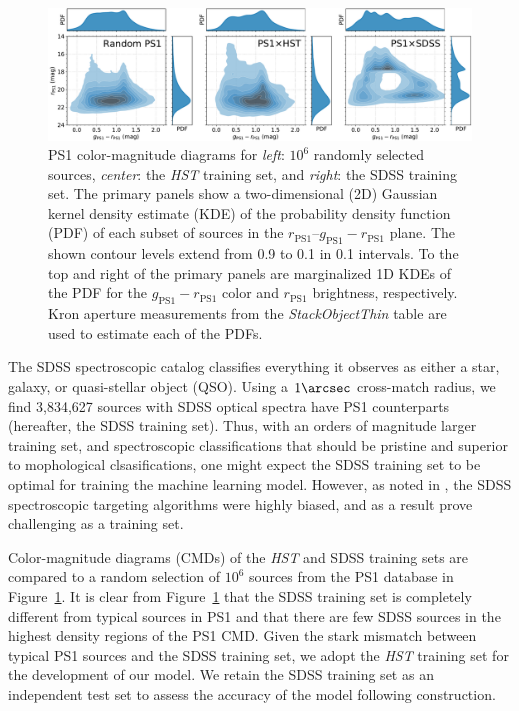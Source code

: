 \documentclass[twocolumn, dvipdfmx]{aastex62}
\begin{document}
\begin{figure}[htb]
 \centering
  \includegraphics[width=7.2in]{./Figures/ColorMagDiagram.pdf}
  \caption{ PS1 color-magnitude diagrams for \textit{left}: $10^6$ randomly
  selected sources, \textit{center}: the \textit{HST} training set, and
  \textit{right}: the SDSS training set. The primary panels show a
  two-dimensional (2D) Gaussian kernel density estimate (KDE) of the
  probability density function (PDF) of each subset of sources in the
  $r_\mathrm{PS1}$--$g_\mathrm{PS1} - r_\mathrm{PS1}$ plane. The shown
  contour levels extend from 0.9 to 0.1 in 0.1 intervals. To the top and
  right of the primary panels are marginalized 1D KDEs of the PDF for the
  $g_\mathrm{PS1} - r_\mathrm{PS1}$ color and $r_\mathrm{PS1}$ brightness,
  respectively. Kron aperture measurements from the \textit{StackObjectThin}
  table are used to estimate each of the PDFs. }
  \label{fig:cmd}
\end{figure}

The SDSS spectroscopic catalog classifies everything it observes as either a
star, galaxy, or quasi-stellar object (QSO). Using a $1\arcsec$ cross-match
radius, we find 3,834,627 sources with SDSS optical spectra have PS1
counterparts (hereafter, the SDSS training set). Thus, with an orders of
magnitude larger training set, and spectroscopic classifications that should
be pristine and superior to mophological clsasifications, one might expect
the SDSS training set to be optimal for training the machine learning model.
However, as noted in \citep{Miller17}, the SDSS spectroscopic targeting
algorithms were highly biased, and as a result prove challenging as a
training set.

Color-magnitude diagrams (CMDs) of the \textit{HST} and SDSS training sets
are compared to a random selection of $10^6$ sources from the PS1 database in
Figure~\ref{fig:cmd}. It is clear from Figure~\ref{fig:cmd} that the SDSS
training set is completely different from typical sources in PS1 and that
there are few SDSS sources in the highest density regions of the PS1 CMD.
Given the stark mismatch between typical PS1 sources and the SDSS training
set, we adopt the \textit{HST} training set for the development of our model.
We retain the SDSS training set as an independent test set to assess the
accuracy of the model following construction.
\end{document}
